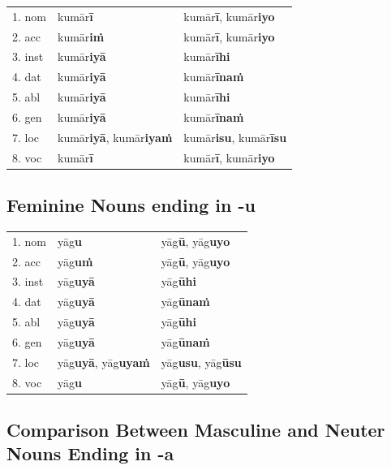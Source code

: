 \documentclass[11pt,oneside]{memoir}
\begin{document}
\begin{center}
\begin{tabular}{lll}
1. nom & kumār\textbf{ī} & kumār\textbf{ī}, kumār\textbf{iyo}\\
2. acc & kumār\textbf{iṁ} & kumār\textbf{ī}, kumār\textbf{iyo}\\
3. inst & kumār\textbf{iyā} & kumār\textbf{īhi}\\
4. dat & kumār\textbf{iyā} & kumār\textbf{īnaṁ}\\
5. abl & kumār\textbf{iyā} & kumār\textbf{īhi}\\
6. gen & kumār\textbf{iyā} & kumār\textbf{īnaṁ}\\
7. loc & kumār\textbf{iyā}, kumār\textbf{iyaṁ} & kumār\textbf{isu}, kumār\textbf{īsu}\\
8. voc & kumār\textbf{ī} & kumār\textbf{ī}, kumār\textbf{iyo}\\
\end{tabular}
\end{center}
\subsection{Feminine Nouns ending in -u}
\label{sec:org6a0f8d7}

\begin{center}
\begin{tabular}{lll}
1. nom & yāg\textbf{u} & yāg\textbf{ū}, yāg\textbf{uyo}\\
2. acc & yāg\textbf{uṁ} & yāg\textbf{ū}, yāg\textbf{uyo}\\
3. inst & yāg\textbf{uyā} & yāg\textbf{ūhi}\\
4. dat & yāg\textbf{uyā} & yāg\textbf{ūnaṁ}\\
5. abl & yāg\textbf{uyā} & yāg\textbf{ūhi}\\
6. gen & yāg\textbf{uyā} & yāg\textbf{ūnaṁ}\\
7. loc & yāg\textbf{uyā}, yāg\textbf{uyaṁ} & yāg\textbf{usu}, yāg\textbf{ūsu}\\
8. voc & yāg\textbf{u} & yāg\textbf{ū}, yāg\textbf{uyo}\\
\end{tabular}
\end{center}

\clearpage
\subsection{Comparison Between Masculine and Neuter Nouns Ending in -a}
\label{sec:org5aa9e1e}
\end{document}
